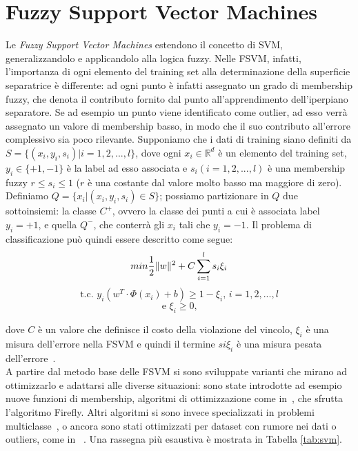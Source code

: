 \documentclass[oneside, openany]{book}
\DeclarePairedDelimiter{\norma}{\lVert}{\rVert}
\begin{document}
	\section{Fuzzy Support Vector Machines}
	Le \textit{Fuzzy Support Vector Machines} estendono il concetto di SVM, generalizzandolo e applicandolo alla logica fuzzy. Nelle FSVM, infatti, l'importanza di ogni elemento del training set alla determinazione della superficie separatrice è differente: ad ogni punto è infatti assegnato un grado di membership fuzzy, che denota il contributo fornito dal punto all'apprendimento dell'iperpiano separatore. Se ad esempio un punto viene identificato come outlier, ad esso verrà assegnato un valore di membership basso, in modo che il suo contributo all'errore complessivo sia poco rilevante. Supponiamo che i dati di training siano definiti da $S = \{(x_i, y_i, s_i)| i=1,2,...,l\}$, dove ogni $x_i \in \mathbb{R}^d$ è un elemento del training set, $y_i \in \{+1, -1\}$ è la label ad esso associata e $s_i(i=1,2,...,l)$ è una membership fuzzy $r \leq s_i \leq 1$ ($r$ è una costante dal valore molto basso ma maggiore di zero). Definiamo $Q=\{x_i|(x_i, y_i, s_i)\in S\}$; possiamo partizionare in $Q$ due sottoinsiemi: la classe $C^+$, ovvero la classe dei punti a cui è associata label $y_i=+1$, e quella $Q^-$, che conterrà gli $x_i$ tali che $y_i=-1$. Il problema di classificazione può quindi essere descritto come segue:
		\[
		min \frac{1}{2} \norma{w}^2+C\sum_{i=1}^{l}s_i\xi_i
		\]
		\[	
		\text{t.c. } y_i(w^T\cdot \Phi(x_i)+b)\geq 1-\xi_i \text{, } i=1, 2, ..., l
		\]
		\[
		\text{e } \xi_i \geq 0\text{,}		
		\]
	
	dove $C$ è un valore che definisce il costo della violazione del vincolo, $\xi_i$ è una misura dell'errore nella FSVM e quindi il termine $si\xi_i$ è una misura pesata dell'errore~\cite{bib:fsvm,bib:fsvm2}.\\
	
	A partire dal metodo base delle FSVM si sono sviluppate varianti che mirano ad ottimizzarlo e adattarsi alle diverse situazioni: sono state introdotte ad esempio nuove funzioni di membership, algoritmi di ottimizzazione come in~\cite{bib:firefly}, che sfrutta l'algoritmo Firefly. Altri algoritmi si sono invece specializzati in problemi multiclasse~\cite{bib:multi}, o ancora sono stati ottimizzati per dataset con rumore nei dati o outliers, come in ~\cite{bib:apso,bib:wcs}. Una rassegna più esaustiva è mostrata in Tabella \ref{tab:svm}.
	
\end{document}
